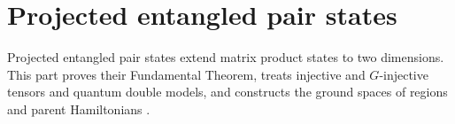 \part{Projected entangled pair states}
\label{part:peps}

Projected entangled pair states extend matrix product states to two
dimensions. This part proves their Fundamental Theorem, treats injective and
$G$-injective tensors and quantum double models, and constructs the ground
spaces of regions and parent Hamiltonians
\cite[Sections~III.B and~IV.B]{Cirac2021Matrix}.
